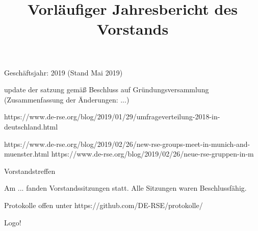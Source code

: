 \documentclass[a4paper]{scrlttr2}
\begin{document}
\title{Vorläufiger Jahresbericht des Vorstands}


Geschäftsjahr: 2019 (Stand Mai 2019)



update der satzung gemäß Beschluss auf Gründungsversammlung (Zusammenfassung der Änderungen: ...)


https://www.de-rse.org/blog/2019/01/29/umfrageverteilung-2018-in-deutschland.html

https://www.de-rse.org/blog/2019/02/26/new-rse-groups-meet-in-munich-and-muenster.html
https://www.de-rse.org/blog/2019/02/26/neue-rse-gruppen-in-m%



Vorstandstreffen

Am ... fanden Vorstandssitzungen statt. Alle Sitzungen waren Beschlussfähig.

Protokolle offen unter https://github.com/DE-RSE/protokolle/




Logo!


\end{document}
